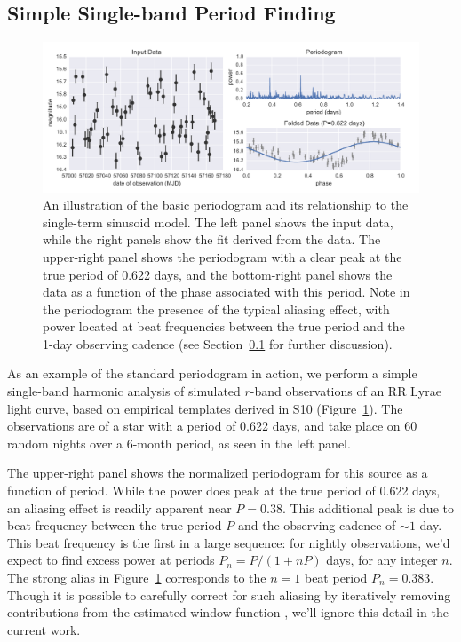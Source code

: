 \documentclass[12pt,preprint]{aastex}
\newcommand{\Fig}[1]{Figure~\ref{fig:#1}}
\newcommand{\fig}[1]{\Fig{#1}}
\newcommand{\figlabel}[1]{\label{fig:#1}}
\newcommand{\Sect}[1]{Section~\ref{sect:#1}}
\newcommand{\sect}[1]{\Sect{#1}}
\newcommand{\sectlabel}[1]{\label{sect:#1}}
\begin{document}
\subsection{Simple Single-band Period Finding}
\sectlabel{simple_period}

\begin{figure}
  \centering
  \includegraphics[width=\textwidth]{fig01.pdf}
  \caption{
    An illustration of the basic periodogram and its relationship to the single-term sinusoid model. The left panel shows the input data, while the right panels show the fit derived from the data. The upper-right panel shows the periodogram with a clear peak at the true period of 0.622 days, and the bottom-right panel shows the data as a function of the phase associated with this period. Note in the periodogram the presence of the typical aliasing effect, with power located at beat frequencies between the true period and the 1-day observing cadence (see \sect{simple_period} for further discussion).
  }
  \figlabel{basic_example}
\end{figure}

As an example of the standard periodogram in action, we perform a simple single-band harmonic analysis of simulated $r$-band observations of an RR Lyrae light curve, based on empirical templates derived in S10 (\fig{basic_example}). The observations are of a star with a period of 0.622 days, and take place on 60 random nights over a 6-month period, as seen in the left panel.

The upper-right panel shows the normalized periodogram for this source as a function of period. While the power does peak at the true period of 0.622 days, an aliasing effect is readily apparent near $P=0.38$. This additional peak is due to beat frequency between the true period $P$ and the observing cadence of $\sim 1$ day. This beat frequency is the first in a large sequence: for nightly observations, we'd expect to find excess power at periods $P_n = P / (1 + nP)$ days, for any integer $n$. The strong alias in \fig{basic_example} corresponds to the $n=1$ beat period $P_n=0.383$. Though it is possible to carefully correct for such aliasing by iteratively removing contributions from the estimated window function \citep[e.g.][]{Roberts87}, we'll ignore this detail in the current work.
\end{document}
